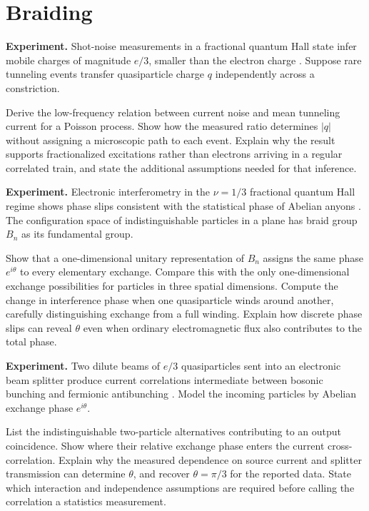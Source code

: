 \section{Braiding}

\begin{exercise}
\textbf{Experiment.}
Shot-noise measurements in a fractional quantum Hall state infer mobile
charges of magnitude \(e/3\), smaller than the electron charge
\cite{de-picciotto}.  Suppose rare tunneling events transfer quasiparticle
charge \(q\) independently across a constriction.

Derive the low-frequency relation between current noise and mean tunneling
current for a Poisson process.  Show how the measured ratio determines
\(|q|\) without assigning a microscopic path to each event.  Explain why the
result supports fractionalized excitations rather than electrons arriving in
a regular correlated train, and state the additional assumptions needed for
that inference.
\end{exercise}

\begin{exercise}
\textbf{Experiment.}
Electronic interferometry in the \(\nu=1/3\) fractional quantum Hall regime
shows phase slips consistent with the statistical phase of Abelian anyons
\cite{nakamura}.  The configuration space of indistinguishable particles in a
plane has braid group \(B_n\) as its fundamental group.

Show that a one-dimensional unitary representation of \(B_n\) assigns the
same phase \(e^{i\theta}\) to every elementary exchange.  Compare this with
the only one-dimensional exchange possibilities for particles in three
spatial dimensions.  Compute the change in interference phase when one
quasiparticle winds around another, carefully distinguishing exchange from a
full winding.  Explain how discrete phase slips can reveal \(\theta\) even
when ordinary electromagnetic flux also contributes to the total phase.
\end{exercise}

\begin{exercise}
\textbf{Experiment.}
Two dilute beams of \(e/3\) quasiparticles sent into an electronic beam
splitter produce current correlations intermediate between bosonic bunching
and fermionic antibunching \cite{bartolomei}.  Model the incoming particles by
Abelian exchange phase \(e^{i\theta}\).

List the indistinguishable two-particle alternatives contributing to an
output coincidence.  Show where their relative exchange phase enters the
current cross-correlation.  Explain why the measured dependence on source
current and splitter transmission can determine \(\theta\), and recover
\(\theta=\pi/3\) for the reported data.  State which interaction and
independence assumptions are required before calling the correlation a
statistics measurement.
\end{exercise}

